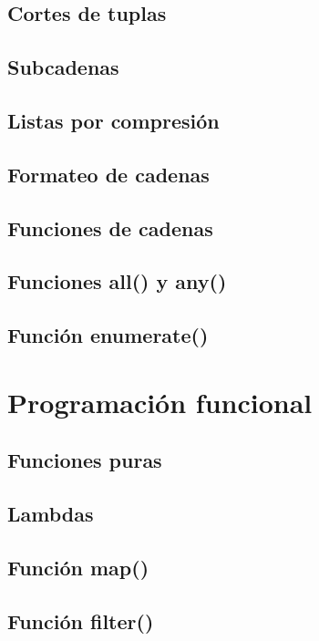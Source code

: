 \documentclass{article}
\begin{document}
\subsection{Cortes de tuplas}

\subsection{Subcadenas}

\subsection{Listas por compresión}

\subsection{Formateo de cadenas}

\subsection{Funciones de cadenas}

\subsection{Funciones all() y any()}

\subsection{Función enumerate()}

\section{Programación funcional}

\subsection{Funciones puras}

\subsection{Lambdas}

\subsection{Función map()}

\subsection{Función filter()}
\end{document}
